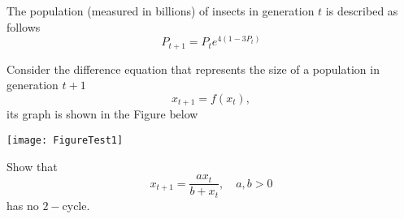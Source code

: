 \documentclass[12pt]{exam}
\begin{document}
\begin{questions}
\newpage

\question[8]
The population (measured in billions) of insects in generation $t$ is described as follows
$$P_{t+1}=P_t e^{4(1-3P_t)}$$
\newpage

\question[8]
Consider the difference equation that represents the size of a population in generation $t+1$ 
$$x_{t+1}=f(x_t),$$
its graph is shown in the Figure below
\begin{center}
\texttt{[image: FigureTest1]}
\end{center}
\newpage




\question[6]
Show that 
$$ x_{t+1}=\frac{ax_t}{b +x_t}, \quad a,b>0$$
has no $2-$cycle.
\newpage






\end{questions}
\end{document}
